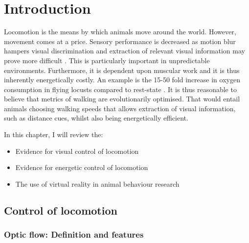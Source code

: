 \chapter{Introduction}
\label{chap:intro}
\vspace{4cm}
Locomotion is the means by which animals move around the world. However, movement comes at a price. Sensory performance is decreased as motion blur hampers visual discrimination \autocites{Kramer2001, Land1999} and extraction of relevant visual information may prove more difficult \autocite{Land1999}. This is particularly important in unpredictable environments. Furthermore, it is dependent upon muscular work and it is thus inherently energetically costly. An example is the 15-50 fold increase in oxygen consumption in flying locusts compared to rest-state \autocite{Krogh1949TheFlight}.
It is thus reasonable to believe that metrics of walking are evolutionarily optimised. That would entail animals choosing walking speeds that allows extraction of visual information, such as distance cues, whilst also being energetically efficient. \\
\vspace{1cm}



In this chapter, I will review the:
\begin{itemize}[noitemsep]
    \item Evidence for visual control of locomotion
    \item Evidence for energetic control of locomotion
    \item The use of virtual reality in animal behaviour research
\end{itemize}

\vfill
\clearpage
\section{Control of locomotion}

\subsection{Optic flow: Definition and features}

